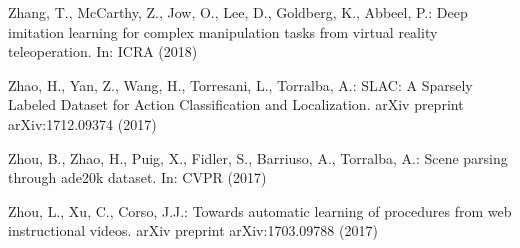 \documentclass[runningheads]{llncs}
\begin{document}
\begin{thebibliography}{10}
Zhang, T., McCarthy, Z., Jow, O., Lee, D., Goldberg, K., Abbeel, P.: Deep
  imitation learning for complex manipulation tasks from virtual reality
  teleoperation. In: ICRA (2018)

Zhao, H., Yan, Z., Wang, H., Torresani, L., Torralba, A.: {SLAC: A Sparsely
  Labeled Dataset for Action Classification and Localization}. arXiv preprint
  arXiv:1712.09374  (2017)

Zhou, B., Zhao, H., Puig, X., Fidler, S., Barriuso, A., Torralba, A.: Scene
  parsing through ade20k dataset. In: CVPR (2017)

Zhou, L., Xu, C., Corso, J.J.: Towards automatic learning of procedures from
  web instructional videos. arXiv preprint arXiv:1703.09788  (2017)

\end{thebibliography}
\end{document}
